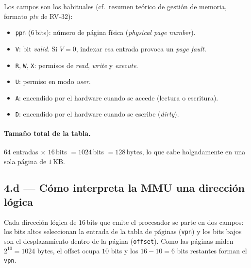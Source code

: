 \documentclass[11pt,a4paper]{article}
\begin{document}
Los campos son los habituales (cf.\ resumen teórico de gestión de
memoria, formato \emph{pte} de RV-32):

\begin{itemize}[leftmargin=*,nosep]
    \item \texttt{ppn} ($6$\,bits): número de página física
        (\emph{physical page number}).
    \item \texttt{V}: bit \emph{valid}. Si $V=0$, indexar esa entrada
        provoca un \emph{page fault}.
    \item \texttt{R}, \texttt{W}, \texttt{X}: permisos de \emph{read},
        \emph{write} y \emph{execute}.
    \item \texttt{U}: permiso en modo \emph{user}.
    \item \texttt{A}: encendido por el hardware cuando se accede
        (lectura o escritura).
    \item \texttt{D}: encendido por el hardware cuando se escribe
        (\emph{dirty}).
\end{itemize}

\paragraph{Tamaño total de la tabla.} $64$ entradas $\times$ $16$\,bits
$= 1024$\,bits $= 128$\,bytes, lo que cabe holgadamente en una sola
página de $1$\,KB.

\subsection{4.d --- Cómo interpreta la MMU una dirección lógica}

Cada dirección lógica de $16$\,bits que emite el procesador se parte
en dos campos: los bits altos seleccionan la entrada de la tabla de
páginas (\texttt{vpn}) y los bits bajos son el desplazamiento dentro
de la página (\texttt{offset}). Como las páginas miden $2^{10} = 1024$
bytes, el offset ocupa $10$ bits y los $16 - 10 = 6$ bits restantes
forman el \texttt{vpn}.

\begin{center}
\end{center}
\end{document}
